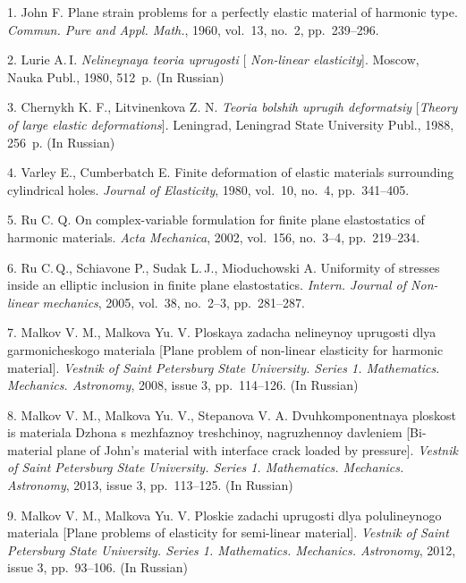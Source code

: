 

{\footnotesize

\vskip 3mm


\vskip 2mm


1. John F. Plane strain problems for a perfectly elastic material
of harmonic type. {\it Commun. Pure and Appl. Math.}, 1960,
vol.~13, no.~2, pp.~239--296.

2. Lurie A.\,I. {\it Nelineynaya teoria uprugosti} [{\it
Non-linear elasticity}]. Moscow, Nauka Publ., 1980, 512~p. (In
Russian)

3. Chernykh K. F., Litvinenkova Z. N. {\it Teoria bolshih uprugih
deformatsiy} [{\it Theory of large elastic deformations}].
Leningrad,  Leningrad State University Publ., 1988, 256~p. (In
Russian)

4. Varley E., Cumberbatch E. Finite deformation of elastic
materials surrounding cylindrical holes. {\it Journal of
Elasticity}, 1980, vol.~10, no.~4, pp.~341--405.

5. Ru C. Q. On complex-variable formulation for finite plane
elastostatics of harmonic materials. {\it Acta Mechanica}, 2002,
vol.~156, no.~3--4, pp.~219--234.

6. Ru C.\,Q., Schiavone P., Sudak L.\,J., Mioduchowski A.
Uniformity of stresses inside an elliptic inclusion in finite
plane elastostatics. {\it Intern. Journal of Non-linear
mechanics}, 2005, vol.~38, no.~2--3, pp.~281--287.

7. Malkov V. M., Malkova Yu. V. Ploskaya zadacha nelineynoy
uprugosti dlya garmonicheskogo materiala [Plane problem of
non-linear elasticity for harmonic material]. {\it Vestnik of
Saint Petersburg State University. Series 1. Mathematics.
Mechanics. Astronomy}, 2008, issue 3, pp.~114--126. (In Russian)

8. Malkov V. M., Malkova Yu. V., Stepanova V. A. Dvuhkomponentnaya
ploskost is materiala Dzhona s mezhfaznoy treshchinoy,
nagruzhennoy davleniem [Bi-material plane of John's material with
interface crack loaded by pressure]. {\it Vestnik of Saint
Petersburg State University. Series 1. Mathematics. Mechanics.
Astronomy}, 2013, issue 3, pp.~113--125. (In Russian)

9. Malkov V. M., Malkova Yu. V. Ploskie zadachi uprugosti dlya
polulineynogo materiala [Plane problems of elasticity for
semi-linear material]. {\it Vestnik of Saint Petersburg State
University. Series 1. Mathematics. Mechanics. Astronomy}, 2012,
issue 3, pp.~93--106. (In Russian)

}
